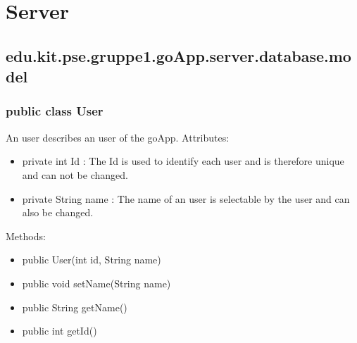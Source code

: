 
\section{Server}
	
	\hypertarget{ServerModel}{}
	\subsection{edu.kit.pse.gruppe1.goApp.server.database.model}

	\subsubsection{public class User}
	An user describes an user of the goApp.
	\newline Attributes:
	\begin{itemize}
	\item private int Id : The Id is used to identify each user and is therefore unique and can not be changed.
	\item private String name : The name of an user is selectable by the user and can also be changed.
	\end{itemize}
	Methods: 
	\begin{itemize}
	\item public User(int id, String name)
	\item public void setName(String name)
	\item public String getName()
	\item public int getId()
	\end{itemize}

